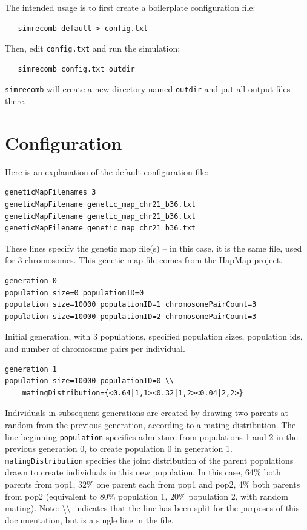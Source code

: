 \documentclass{article}
\begin{document}
\noindent The intended usage is to first create a boilerplate configuration file:
\begin{verbatim}
   simrecomb default > config.txt
\end{verbatim}

\noindent Then, edit \texttt{config.txt} and run the simulation:
\begin{verbatim}
   simrecomb config.txt outdir
\end{verbatim}
\noindent \texttt{simrecomb} will create a new directory named \texttt{outdir} and put
all output files there.

\section*{Configuration}

Here is an explanation of the default configuration file:

\begin{verbatim}
geneticMapFilenames 3
geneticMapFilename genetic_map_chr21_b36.txt
geneticMapFilename genetic_map_chr21_b36.txt
geneticMapFilename genetic_map_chr21_b36.txt
\end{verbatim}

\noindent These lines specify the genetic map file(s) -- in this case, it is
the same file, used for 3 chromosomes.  This genetic map file comes from the
HapMap project.

\begin{verbatim}
generation 0
population size=0 populationID=0
population size=10000 populationID=1 chromosomePairCount=3
population size=10000 populationID=2 chromosomePairCount=3
\end{verbatim}

\noindent Initial generation, with 3 populations, specified population sizes,
population ids, and number of chromosome pairs per individual.

\begin{verbatim}
generation 1
population size=10000 populationID=0 \\
    matingDistribution={<0.64|1,1><0.32|1,2><0.04|2,2>}
\end{verbatim}

\noindent Individuals in subsequent generations are created by drawing two
parents at random from the previous generation, according to a mating
distribution.  The line beginning \texttt{population} specifies admixture from
populations 1 and 2 in the previous generation 0, to create population 0 in
generation 1.  \texttt{matingDistribution} specifies the joint distribution of
the parent populations drawn to create individuals in this new population.  In
this case, 64\% both parents from pop1, 32\% one parent each from pop1 and
pop2, 4\% both parents from pop2 (equivalent to 80\% population 1, 20\%
population 2, with random mating).  Note: \textbackslash\textbackslash \,
indicates that the line has been split for the purposes of this documentation,
but is a single line in the file.
\end{document}
